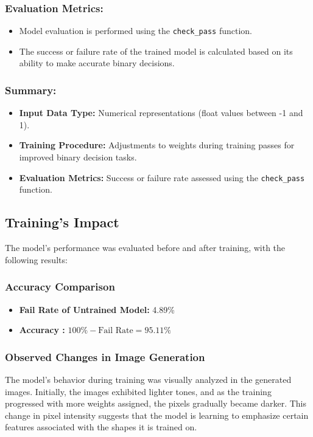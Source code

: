 \documentclass{article}
\begin{document}
\subsubsection*{Evaluation Metrics:}
\begin{itemize}
  \item Model evaluation is performed using the \texttt{check\_pass} function.
  \item The success or failure rate of the trained model is calculated based on its ability to make accurate binary decisions.
\end{itemize}
\subsubsection*{Summary:}
\begin{itemize}
  \item \textbf{Input Data Type:} Numerical representations (float values between -1 and 1).
  \item \textbf{Training Procedure:} Adjustments to weights during training passes for improved binary decision tasks.
  \item \textbf{Evaluation Metrics:} Success or failure rate assessed using the \texttt{check\_pass} function.
\end{itemize}
\clearpage
\subsection{Training's Impact}
The model's performance was evaluated before and after training, with the following results:
\subsubsection*{Accuracy Comparison}
\begin{itemize}
    \item \textbf{Fail Rate of Untrained Model:} 4.89\%
    \item \textbf{Accuracy :} \(100\% - \text{{Fail Rate}} = 95.11\%\)
   
\end{itemize}
\subsubsection*{Observed Changes in Image Generation}
The model's behavior during training was visually analyzed in the generated images. Initially, the images exhibited lighter tones, and as the training progressed with more weights assigned, the pixels gradually became darker. This change in pixel intensity suggests that the model is learning to emphasize certain features associated with the shapes it is trained on.
\end{document}
